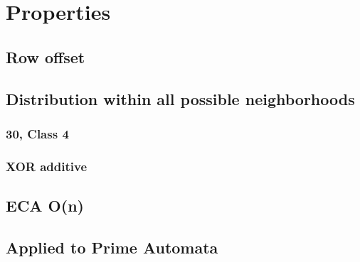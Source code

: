 \documentclass[11pt]{article}
\begin{document}
	\section{Properties}

    \subsection{Row offset}
    \subsection{Distribution within all possible neighborhoods}
    \subsubsection{30, Class 4}
    \subsubsection{XOR additive}
        \subsection{ECA O(n)}
    \subsection{Applied to Prime Automata}
    \cite{Wolfram}

    
    
\end{document}

